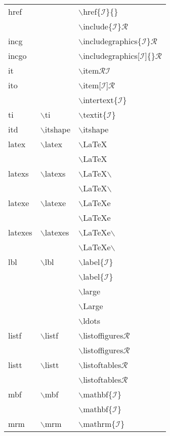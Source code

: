 \begin{longtable}{p{20mm}p{20mm}p{65mm}}
href &  & $\backslash$href\{$\mathcal{I}$\}\{\}\\
 &  & $\backslash$include\{$\mathcal{I}$\}$\mathcal{R}$\\
incg &  & $\backslash$includegraphics\{$\mathcal{I}$\}$\mathcal{R}$\\
incgo &  & $\backslash$includegraphics[$\mathcal{I}$]\{\}$\mathcal{R}$\\
it &  & $\backslash$item$\mathcal{RI}$\\
ito &  & $\backslash$item[$\mathcal{I}$]$\mathcal{R}$\\
 &  & $\backslash$intertext\{$\mathcal{I}$\}\\
ti & $\backslash$ti & $\backslash$textit\{$\mathcal{I}$\}\\
itd & $\backslash$itshape & $\backslash$itshape\\
latex & $\backslash$latex & $\backslash$LaTeX\\
 &  & $\backslash$LaTeX\\
latexs & $\backslash$latexs & $\backslash$LaTeX$\backslash$ \\
 &  & $\backslash$LaTeX$\backslash$ \\
latexe & $\backslash$latexe & $\backslash$LaTeXe\\
 &  & $\backslash$LaTeXe\\
latexes & $\backslash$latexes & $\backslash$LaTeXe$\backslash$ \\
 &  & $\backslash$LaTeXe$\backslash$ \\
lbl & $\backslash$lbl & $\backslash$label\{$\mathcal{I}$\}\\
 &  & $\backslash$label\{$\mathcal{I}$\}\\
 &  & $\backslash$large\\
 &  & $\backslash$Large\\
 &  & $\backslash$ldots\\
listf & $\backslash$listf & $\backslash$listoffigures$\mathcal{R}$\\
 &  & $\backslash$listoffigures$\mathcal{R}$\\
listt & $\backslash$listt & $\backslash$listoftables$\mathcal{R}$\\
 &  & $\backslash$listoftables$\mathcal{R}$\\
mbf & $\backslash$mbf & $\backslash$mathbf\{$\mathcal{I}$\}\\
 &  & $\backslash$mathbf\{$\mathcal{I}$\}\\
mrm & $\backslash$mrm & $\backslash$mathrm\{$\mathcal{I}$\}\\

\end{longtable}
